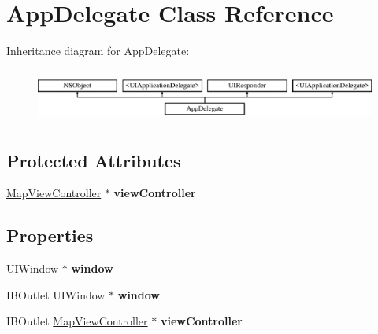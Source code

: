 \hypertarget{interface_app_delegate}{\section{App\-Delegate Class Reference}
\label{interface_app_delegate}
}
Inheritance diagram for App\-Delegate\-:\begin{figure}[H]
\begin{center}
\leavevmode
\includegraphics[height=1.772152cm]{interface_app_delegate}
\end{center}
\end{figure}
\subsection*{Protected Attributes}
\begin{DoxyCompactItemize}
\item 
\hypertarget{interface_app_delegate_aa22afbe0037987ac2757d6a5e84efd13}{\hyperlink{interface_map_view_controller}{Map\-View\-Controller} $\ast$ {\bfseries view\-Controller}}\label{interface_app_delegate_aa22afbe0037987ac2757d6a5e84efd13}

\end{DoxyCompactItemize}
\subsection*{Properties}
\begin{DoxyCompactItemize}
\item 
\hypertarget{interface_app_delegate_a3f3fc931ef1bc9ac366cfe4684a18167}{U\-I\-Window $\ast$ {\bfseries window}}\label{interface_app_delegate_a3f3fc931ef1bc9ac366cfe4684a18167}

\item 
\hypertarget{interface_app_delegate_a055d472434a4ee0b915c207957a400e1}{I\-B\-Outlet U\-I\-Window $\ast$ {\bfseries window}}\label{interface_app_delegate_a055d472434a4ee0b915c207957a400e1}

\item 
\hypertarget{interface_app_delegate_a5b5475af5a71e801e164575948f11239}{I\-B\-Outlet \hyperlink{interface_map_view_controller}{Map\-View\-Controller} $\ast$ {\bfseries view\-Controller}}\label{interface_app_delegate_a5b5475af5a71e801e164575948f11239}

\end{DoxyCompactItemize}


